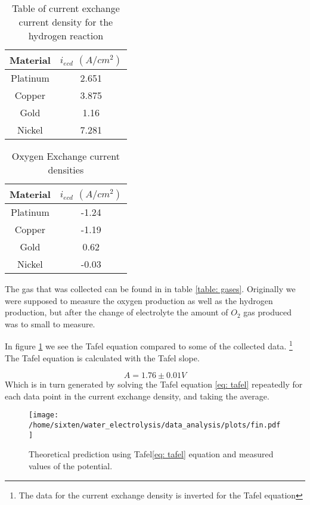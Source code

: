\documentclass[twocolumn, floatfix]{revtex4-2}
\begin{document}
\begin{table}[h]
\begin{tabular}{c | c}
Material & $i_{ecd}$ $(A/cm^2)$ \\
\hline
\hline
Platinum & 2.651 \\ 

Copper & 3.875 \\ 

Gold & 1.16 \\ 

Nickel & 7.281 \\ 
\end{tabular}
	\caption{Table of current exchange current density for the hydrogen reaction\label{table: ecd_H}}
\end{table}

\begin{table}[h]
	\begin{tabular}{c|c}
		Material & $i_{ecd}$ $(A/cm^2)$ \\
		\hline
		\hline
		Platinum& -1.24\\
						 
		Copper& -1.19\\

		Gold& 0.62\\
					    
		Nickel& -0.03\\
	\end{tabular}
	\caption{Oxygen Exchange current densities\label{table: ecd_O}}
\end{table}

\par
The gas that was collected can be found in in table \ref{table: gases}. Originally we were supposed to 
measure the oxygen production as well as the hydrogen production, but after  the change of electrolyte
the amount of $O_2$ gas produced was to small to measure.

In figure \ref{fig: tafel} we see the Tafel equation compared to some of the collected data.
\footnote{The data for the current exchange density is inverted for the Tafel equation} The
Tafel equation is calculated with the Tafel slope.

\begin{equation}
	A = 1.76 \pm 0.01 V
\end{equation}
Which is in turn generated by solving the Tafel equation \ref{eq: tafel} repeatedly for each
data point in the current exchange density, and taking the average.
\begin{figure}[b]
	\texttt{[image: /home/sixten/water\_electrolysis/data\_analysis/plots/fin.pdf]}
	\caption{Theoretical prediction using Tafel\ref{eq: tafel} equation and measured
	values of the potential.\label{fig: tafel}}
\end{figure}
\end{document}
